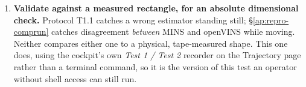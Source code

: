 \begin{enumerate}[leftmargin=1.4em]
  loop and compare MINS against openVINS on the same run, following
  \S\ref{ap:repro-comprun} end to end. That procedure also covers switching
  the cockpit's \emph{Pose Source} to MINS and recording both estimators to a
  rosbag, which the website's own buffers are not reliable enough to replace.
\item \textbf{Validate against a measured rectangle, for an absolute
  dimensional check.} Protocol T1.1 catches a wrong estimator standing
  still; \S\ref{ap:repro-comprun} catches disagreement \emph{between} MINS
  and openVINS while moving. Neither compares either one to a physical,
  tape-measured shape. This one does, using the cockpit's own \emph{Test 1
  / Test 2} recorder on the Trajectory page rather than a terminal command,
  so it is the version of this test an operator without shell access can
  still run.


\end{enumerate}
